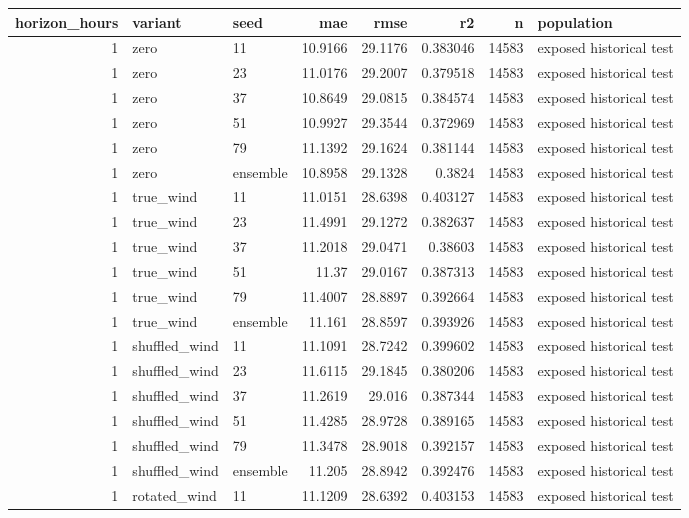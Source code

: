 \begin{tabular}{rllrrrrl}
\hline
horizon\_hours & variant & seed & mae & rmse & r2 & n & population \\
\hline
1 & zero & 11 & 10.9166 & 29.1176 & 0.383046 & 14583 & exposed historical test \\
1 & zero & 23 & 11.0176 & 29.2007 & 0.379518 & 14583 & exposed historical test \\
1 & zero & 37 & 10.8649 & 29.0815 & 0.384574 & 14583 & exposed historical test \\
1 & zero & 51 & 10.9927 & 29.3544 & 0.372969 & 14583 & exposed historical test \\
1 & zero & 79 & 11.1392 & 29.1624 & 0.381144 & 14583 & exposed historical test \\
1 & zero & ensemble & 10.8958 & 29.1328 & 0.3824 & 14583 & exposed historical test \\
1 & true\_wind & 11 & 11.0151 & 28.6398 & 0.403127 & 14583 & exposed historical test \\
1 & true\_wind & 23 & 11.4991 & 29.1272 & 0.382637 & 14583 & exposed historical test \\
1 & true\_wind & 37 & 11.2018 & 29.0471 & 0.38603 & 14583 & exposed historical test \\
1 & true\_wind & 51 & 11.37 & 29.0167 & 0.387313 & 14583 & exposed historical test \\
1 & true\_wind & 79 & 11.4007 & 28.8897 & 0.392664 & 14583 & exposed historical test \\
1 & true\_wind & ensemble & 11.161 & 28.8597 & 0.393926 & 14583 & exposed historical test \\
1 & shuffled\_wind & 11 & 11.1091 & 28.7242 & 0.399602 & 14583 & exposed historical test \\
1 & shuffled\_wind & 23 & 11.6115 & 29.1845 & 0.380206 & 14583 & exposed historical test \\
1 & shuffled\_wind & 37 & 11.2619 & 29.016 & 0.387344 & 14583 & exposed historical test \\
1 & shuffled\_wind & 51 & 11.4285 & 28.9728 & 0.389165 & 14583 & exposed historical test \\
1 & shuffled\_wind & 79 & 11.3478 & 28.9018 & 0.392157 & 14583 & exposed historical test \\
1 & shuffled\_wind & ensemble & 11.205 & 28.8942 & 0.392476 & 14583 & exposed historical test \\
1 & rotated\_wind & 11 & 11.1209 & 28.6392 & 0.403153 & 14583 & exposed historical test \\

\end{tabular}
